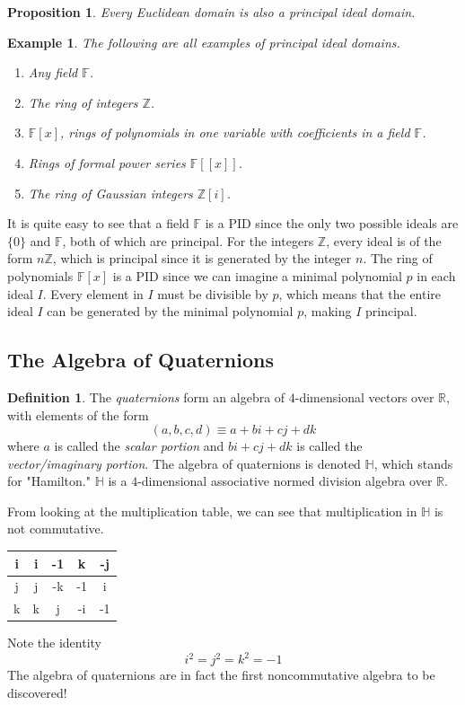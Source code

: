 \documentclass{article}
\newtheorem{proposition}[theorem]{Proposition}
\newtheorem{example}{Example}[section]
\theoremstyle{remark}
\theoremstyle{definition}
\newtheorem{definition}{Definition}[section]
\begin{document}
\begin{proposition}
Every Euclidean domain is also a principal ideal domain. 
\end{proposition}

\begin{example}
The following are all examples of principal ideal domains. 
\begin{enumerate}
    \item Any field $\mathbb{F}$. 
    \item The ring of integers $\mathbb{Z}$. 
    \item $\mathbb{F}[x]$, rings of polynomials in one variable with coefficients in a field $\mathbb{F}$. 
    \item Rings of formal power series $\mathbb{F}[[x]]$. 
    \item The ring of Gaussian integers $\mathbb{Z}[i]$. 
\end{enumerate}
\end{example}

It is quite easy to see that a field $\mathbb{F}$ is a PID since the only two possible ideals are $\{0\}$ and $\mathbb{F}$, both of which are principal. For the integers $\mathbb{Z}$, every ideal is of the form $n\mathbb{Z}$, which is principal since it is generated by the integer $n$. The ring of polynomials $\mathbb{F}[x]$ is a PID since we can imagine a minimal polynomial $p$ in each ideal $I$. Every element in $I$ must be divisible by $p$, which means that the entire ideal $I$ can be generated by the minimal polynomial $p$, making $I$ principal. 

\subsection{The Algebra of Quaternions}
\begin{definition}
The \textit{quaternions} form an algebra of $4$-dimensional vectors over $\mathbb{R}$, with elements of the form
\[(a, b, c, d) \equiv a + bi + cj + dk\]
where $a$ is called the \textit{scalar portion} and $bi + cj + dk$ is called the \textit{vector/imaginary portion}. The algebra of quaternions is denoted $\mathbb{H}$, which stands for "Hamilton." $\mathbb{H}$ is a $4$-dimensional associative normed division algebra over $\mathbb{R}$. 
\end{definition}

From looking at the multiplication table, we can see that multiplication in $\mathbb{H}$ is not commutative. 
\begin{center}
\begin{tabular}{|c|c|c|c|c|}
\hline
i & i & -1 & k & -j \\ 
\hline
j & j & -k & -1 & i \\ 
\hline
k & k & j & -i & -1 \\ 
\hline
\end{tabular}
\end{center}
Note the identity 
\[i^2 = j^2 = k^2 = -1\]
The algebra of quaternions are in fact the first noncommutative algebra to be discovered! 
\end{document}
